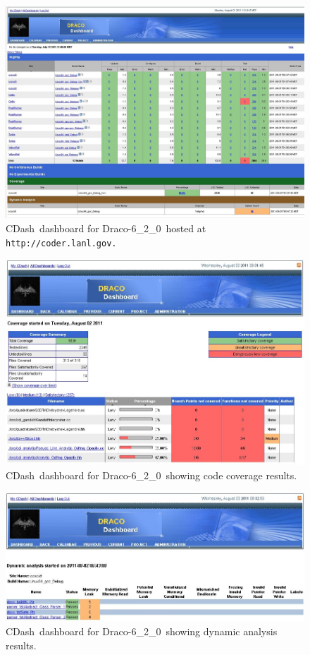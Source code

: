 \documentclass[note]{ResearchNote_pdf}
\newcommand{\draco}{Draco}
\newcommand{\dracor}{\draco-6\_2\_0}
\newcommand{\cdash}{\textsf{CDash}}
\begin{document}
\begin{figure}
  \centerline{
    \includegraphics[width=8.0in,angle=90]{dashboard-620.jpg}}
  \caption{\cdash\ dashboard for \dracor\ hosted at \texttt{http://coder.lanl.gov.}}
  \label{fig:dashboard}
\end{figure}

\begin{figure}
  \centerline{
    \includegraphics[width=6.0in,angle=0]{dashboard-cc-620.jpg}}
  \caption{\cdash\ dashboard for \dracor\ showing code coverage results.}
  \label{fig:ccdashboard}
\end{figure}
\begin{figure}
  \centerline{
    \includegraphics[width=6.0in,angle=0]{dashboard-valgrind-620.jpg}}
  \caption{\cdash\ dashboard for \dracor\ showing dynamic analysis results.}
  \label{fig:vgdashboard}
\end{figure}
\end{document}
